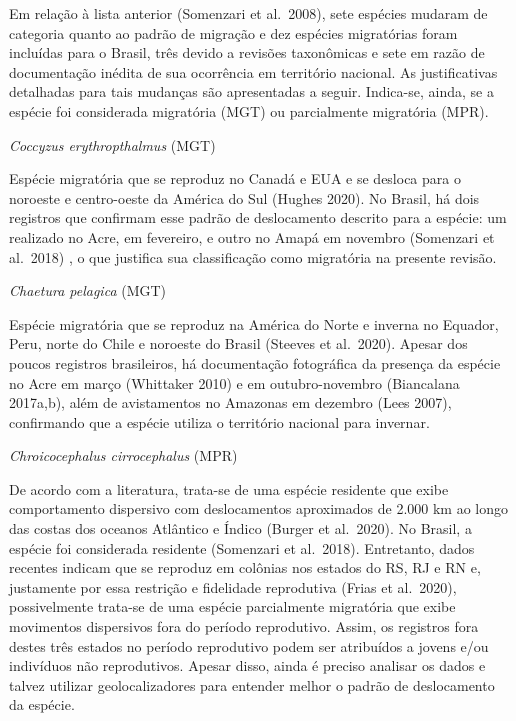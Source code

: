 \documentclass[
  oneside]{scrbook}
\begin{document}
Em relação à lista anterior (Somenzari et al.~2008), sete espécies mudaram de categoria quanto ao padrão de migração e dez espécies migratórias foram incluídas para o Brasil, três devido a revisões taxonômicas e sete em razão de documentação inédita de sua ocorrência em território nacional. As justificativas detalhadas para tais mudanças são apresentadas a seguir. Indica-se, ainda, se a espécie foi considerada migratória (MGT) ou parcialmente migratória (MPR).

\begin{blackbox}
\emph{Coccyzus erythropthalmus} (MGT)

Espécie migratória que se reproduz no Canadá e EUA e se desloca para o noroeste e centro-oeste da América do Sul (Hughes 2020). No Brasil, há dois registros que confirmam esse padrão de deslocamento descrito para a espécie: um realizado no Acre, em fevereiro, e outro no Amapá em novembro (Somenzari et al.~2018) , o que justifica sua classificação como migratória na presente revisão.

\end{blackbox}

\begin{blackbox}
\emph{Chaetura pelagica} (MGT)

Espécie migratória que se reproduz na América do Norte e inverna no Equador, Peru, norte do Chile e noroeste do Brasil (Steeves et al.~2020). Apesar dos poucos registros brasileiros, há documentação fotográfica da presença da espécie no Acre em março (Whittaker 2010) e em outubro-novembro (Biancalana 2017a,b), além de avistamentos no Amazonas em dezembro (Lees 2007), confirmando que a espécie utiliza o território nacional para invernar.

\end{blackbox}

\begin{blackbox}
\emph{Chroicocephalus cirrocephalus} (MPR)

De acordo com a literatura, trata-se de uma espécie residente que exibe comportamento dispersivo com deslocamentos aproximados de 2.000 km ao longo das costas dos oceanos Atlântico e Índico (Burger et al.~2020). No Brasil, a espécie foi considerada residente (Somenzari et al.~2018). Entretanto, dados recentes indicam que se reproduz em colônias nos estados do RS, RJ e RN e, justamente por essa restrição e fidelidade reprodutiva (Frias et al.~2020), possivelmente trata-se de uma espécie parcialmente migratória que exibe movimentos dispersivos fora do período reprodutivo. Assim, os registros fora destes três estados no período reprodutivo podem ser atribuídos a jovens e/ou indivíduos não reprodutivos. Apesar disso, ainda é preciso analisar os dados e talvez utilizar geolocalizadores para entender melhor o padrão de deslocamento da espécie.

\end{blackbox}
\end{document}
